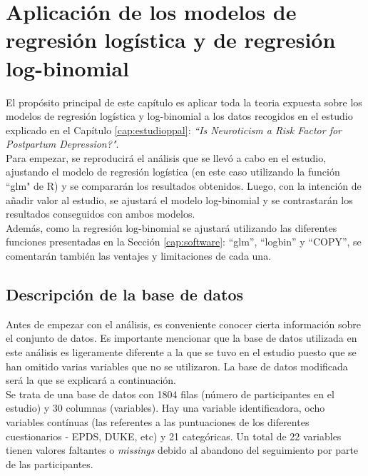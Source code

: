 \chapter[Aplicación de los modelos de regresión]{Aplicación de los modelos de regresión logística y de regresión log-binomial}\label{cap:aplicacion}

El propósito principal de este capítulo es aplicar toda la teoria expuesta sobre los modelos de regresión logística y log-binomial a los datos recogidos en el estudio explicado en el Capítulo \ref{cap:estudioppal}: \textit{``Is Neuroticism a Risk Factor for Postpartum Depression?"}.\\

Para empezar, se reproducirá el análisis que se llevó a cabo en el estudio, ajustando el modelo de regresión logística (en este caso utilizando la función ``glm" de R) y se compararán los resultados obtenidos. Luego, con la intención de añadir valor al estudio, se ajustará el modelo log-binomial y se contrastarán los resultados conseguidos con ambos modelos.\\

Además, como la regresión log-binomial se ajustará utilizando las diferentes funciones presentadas en la Sección \ref{cap:software}: ``glm'', ``logbin'' y ``COPY'', se comentarán también las ventajes y limitaciones de cada una.

\section{Descripción de la base de datos}\label{cap:descriptiva}

Antes de empezar con el análisis, es conveniente conocer cierta información sobre el conjunto de datos. Es importante mencionar que la base de datos utilizada en este análisis es ligeramente diferente a la que se tuvo en el estudio puesto que se han omitido varias variables que no se utilizaron. La base de datos modificada será la que se explicará a continuación. \\

Se trata de una base de datos con 1804 filas (número de participantes en el estudio) y 30 columnas (variables). Hay una variable identificadora, ocho variables contínuas (las referentes a las puntuaciones de los diferentes cuestionarios - EPDS, DUKE, etc) y 21 categóricas. Un total de 22 variables tienen valores faltantes o \textit{missings} debido al abandono del seguimiento por parte de las participantes.\\

